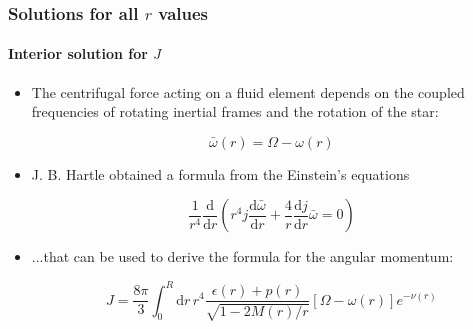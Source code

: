 \begin{frame}
\frametitle{Solutions for all $r$ values}
\framesubtitle{Interior solution for $J$}

\begin{itemize}
	\item The centrifugal force acting on a fluid element depends on the coupled frequencies of rotating inertial frames and the rotation of the star:
	\begin{block}{}
		\begin{equation} \label{eq:6}
			\bar{\omega} (r)
			=
			\Omega - \omega (r)
		\end{equation}
	\end{block}
	\item J. B. Hartle obtained a formula from the Einstein's equations
	\begin{block}{}
		\begin{equation} \label{eq:7}
			\frac{1}{r^{4}} \frac{\mathrm{d}}{\mathrm{d} r}
			\left(
				r^{4} j \frac{\mathrm{d} \bar{\omega}}{\mathrm{d} r}
				+
				\frac{4}{r} \frac{\mathrm{d} j}{\mathrm{d} r} \bar{\omega}
				=
				0
			\right)
		\end{equation}
	\end{block}		
	\item ...that can be used to derive the formula for the angular momentum:
	\begin{block}{}
		\begin{equation} \label{eq:8}
			J
			=
			\frac{8 \pi}{3} \int_{0}^{R} \mathrm{d}r\,r^{4}
			\frac{
				\epsilon (r) + p (r)
			}{
				\sqrt{1 - 2 M (r) / r}
			}
			\left[
				\Omega - \omega (r)
			\right]
			e^{- \nu (r)}
		\end{equation}
	\end{block}
\end{itemize}

\end{frame}
